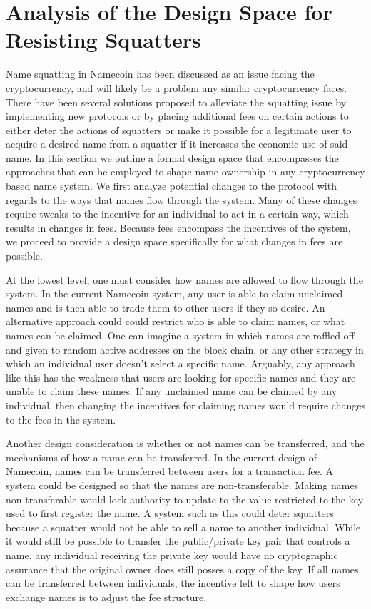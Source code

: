 \section{Analysis of the Design Space for Resisting Squatters}
\label{sec:analysis}

    Name squatting in Namecoin has been discussed as an issue facing the cryptocurrency, and will likely be a problem any similar cryptocurrency faces. There have been several solutions proposed to alleviate the squatting issue by implementing new protocols or by placing additional fees on certain actions to either deter the actions of squatters or make it possible for a legitimate user to acquire a desired name from a squatter if it increases the economic use of said name. In this section we outline a formal design space that encompasses the approaches that can be employed to shape name ownership in any cryptocurrency based name system. We first analyze potential changes to the protocol with regards to the ways that names flow through the system. Many of these changes require tweaks to the incentive for an individual to act in a certain way, which results in changes in fees. Because fees encompass the incentives of the system, we proceed to provide a design space specifically for what changes in fees are possible.

    At the lowest level, one must consider how names are allowed to flow through the system. In the current Namecoin system, any user is able to claim unclaimed names and is then able to trade them to other users if they so desire. An alternative approach could could restrict who is able to claim names, or what names can be claimed. One can imagine a system in which names are raffled off and given to random active addresses on the block chain, or any other strategy in which an individual user doesn't select a specific name. Arguably, any approach like this has the weakness that users are looking for specific names and they are unable to claim these names. If any unclaimed name can be claimed by any individual, then changing the incentives for claiming names would require changes to the fees in the system.

    Another design consideration is whether or not names can be transferred, and the mechanisms of how a name can be transferred. In the current design of Namecoin, names can be transferred between users for a transaction fee. A system could be designed so that the names are non-transferable. Making names non-transferable would lock authority to update to the value restricted to the key used to first register the name. A system such as this could deter squatters because a squatter would not be able to sell a name to another individual. While it would still be possible to transfer the public/private key pair that controls a name, any individual receiving the private key would have no cryptographic assurance that the original owner does still posses a copy of the key. If all names can be transferred between individuals, the incentive left to shape how users exchange names is to adjust the fee structure. 

